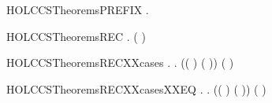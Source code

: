 \newcommand{\HOLCCSTheoremsPARXXcasesXXEQ}{\UseVerbatim{HOLCCSTheoremsPARXXcasesXXEQ}}
\begin{SaveVerbatim}{HOLCCSTheoremsPREFIX}
\HOLTokenTurnstile{} \HOLSymConst{\HOLTokenForall{}} .  \HOLTokenTransBegin{}\HOLTokenTransEnd {}
\end{SaveVerbatim}
\newcommand{\HOLCCSTheoremsPREFIX}{\UseVerbatim{HOLCCSTheoremsPREFIX}}
\begin{SaveVerbatim}{HOLCCSTheoremsREC}
\HOLTokenTurnstile{} \HOLSymConst{\HOLTokenForall{}}   .   (  )  \HOLTokenTransBegin{}\HOLTokenTransEnd {} \HOLSymConst{\HOLTokenImp{}}    \HOLTokenTransBegin{}\HOLTokenTransEnd {}
\end{SaveVerbatim}
\newcommand{\HOLCCSTheoremsREC}{\UseVerbatim{HOLCCSTheoremsREC}}
\begin{SaveVerbatim}{HOLCCSTheoremsRECXXcases}
\HOLTokenTurnstile{} \HOLSymConst{\HOLTokenForall{}}   .
          \HOLTokenTransBegin{}\HOLTokenTransEnd {} \HOLSymConst{\HOLTokenImp{}}
       \HOLSymConst{\HOLTokenExists{}} .
           (( \HOLSymConst{=} ) \HOLSymConst{\HOLTokenConj{}} ( \HOLSymConst{=} )) \HOLSymConst{\HOLTokenConj{}}
             (  )  \HOLTokenTransBegin{}\HOLTokenTransEnd {}
\end{SaveVerbatim}
\newcommand{\HOLCCSTheoremsRECXXcases}{\UseVerbatim{HOLCCSTheoremsRECXXcases}}
\begin{SaveVerbatim}{HOLCCSTheoremsRECXXcasesXXEQ}
\HOLTokenTurnstile{} \HOLSymConst{\HOLTokenForall{}}   .
          \HOLTokenTransBegin{}\HOLTokenTransEnd {} \HOLSymConst{\HOLTokenEquiv{}}
       \HOLSymConst{\HOLTokenExists{}} .
           (( \HOLSymConst{=} ) \HOLSymConst{\HOLTokenConj{}} ( \HOLSymConst{=} )) \HOLSymConst{\HOLTokenConj{}}
             (  )  \HOLTokenTransBegin{}\HOLTokenTransEnd {}
\end{SaveVerbatim}
